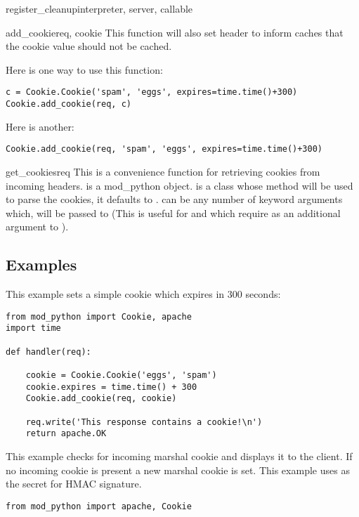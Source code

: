 \begin{funcdesc}{register_cleanup}{interpreter, server, callable}
\begin{funcdesc}{add_cookie}{req, cookie}
  This function will also set  header to inform caches that the cookie value
  should not be cached.

  Here is one way to use this function:
  \begin{verbatim}
c = Cookie.Cookie('spam', 'eggs', expires=time.time()+300)
Cookie.add_cookie(req, c)
  \end{verbatim}
  Here is another:
  \begin{verbatim}
Cookie.add_cookie(req, 'spam', 'eggs', expires=time.time()+300)
  \end{verbatim}
\end{funcdesc}

\begin{funcdesc}{get_cookies}{req }
  This is a convenience function for retrieving cookies from incoming
  headers.  is a mod_python 
  object.  is a class whose  method will be
  used to parse the cookies, it defaults to . 
  can be any number of keyword arguments which, will be passed to
   (This is useful for  and
   which require  as an additional
  argument to ).
\end{funcdesc}

\subsection{Examples\label{pyapi-cookie-example}}

This example sets a simple cookie which expires in 300 seconds:

\begin{verbatim}
from mod_python import Cookie, apache
import time

def handler(req):

    cookie = Cookie.Cookie('eggs', 'spam')
    cookie.expires = time.time() + 300
    Cookie.add_cookie(req, cookie)

    req.write('This response contains a cookie!\n')
    return apache.OK

\end{verbatim}

This example checks for incoming marshal cookie and displays it to the
client. If no incoming cookie is present a new marshal cookie is set.
This example uses  as the secret for HMAC signature.

\begin{verbatim}
from mod_python import apache, Cookie


\end{verbatim}
\end{funcdesc}
